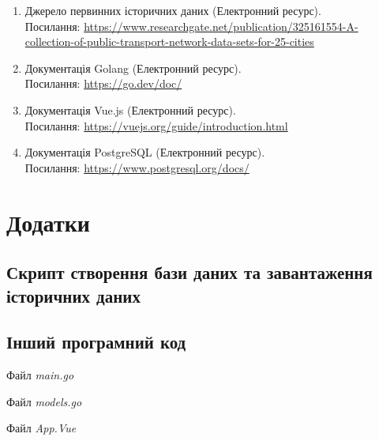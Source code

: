 \documentclass[oneside,14pt]{extarticle}
\begin{document}
\begin{enumerate}
\item Джерело первинних історичних даних (Електронний ресурс). \\Посилання: \href{https://www.researchgate.net/publication/325161554_A_collection_of_public_transport_network_data_sets_for_25_cities}{https://www.researchgate.net/publication/325161554-A-collection-of-public-transport-network-data-sets-for-25-cities}
\item Документація Golang (Електронний ресурс). \\Посилання: \href{https://go.dev/doc/}{https://go.dev/doc/}
\item Документація Vue.js (Електронний ресурс). \\Посилання: \href{https://vuejs.org/guide/introduction.html}{https://vuejs.org/guide/introduction.html}
\item Документація PostgreSQL (Електронний ресурс). \\Посилання: \href{https://www.postgresql.org/docs/}{https://www.postgresql.org/docs/}
\end{enumerate}

\newpage

\section*{Додатки}
\setcounter{subsection}{0}
\subsection{Скрипт створення бази даних та завантаження історичних даних}
{\fontsize{8pt}{8pt}\selectfont}

\subsection{Інший програмний код}
Файл \textit{main.go}
{\fontsize{8pt}{8pt}\selectfont}

Файл \textit{models.go}
{\fontsize{8pt}{8pt}\selectfont}

Файл \textit{App.Vue}
{\fontsize{8pt}{8pt}\selectfont}
\end{document}
